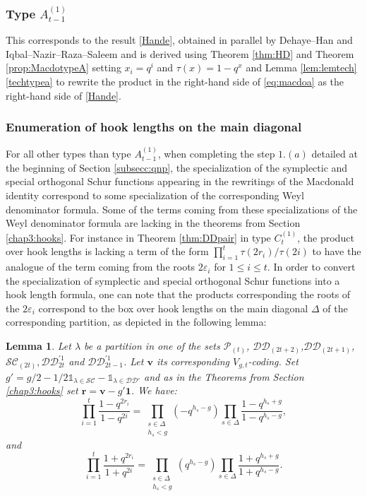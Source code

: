 \documentclass[11pt,letterpaper]{amsart}
\def\ccsc{\mathcal {SC}}
\def\ccdd{\mathcal {DD}}
\def\ccp{\mathcal P}
\newtheorem{lm}[df]{Lemma}
\numberwithin{equation}{section}
\numberwithin{df}{section}
\begin{document}
\subsubsection{Type $A^{(1)}_{t-1}$}

This corresponds to the result \eqref{Hande}, obtained in parallel by Dehaye--Han \cite{HD} and Iqbal--Nazir--Raza--Saleem \cite{INRS} and is derived using Theorem \ref{thm:HD} and Theorem \ref{prop:MacdotypeA} setting $x_i=q^i$ and $\tau(x)=1-q^x$ and Lemma \ref{lem:lemtech} \eqref{techtypea} to rewrite the product in the right-hand side of \eqref{eq:macdoa} as the right-hand side of \eqref{Hande}.

\subsubsection{Enumeration of hook lengths on the main diagonal}

For all other types than type $A^{(1)}_{t-1}$, when completing the step $1.(a)$ detailed at the beginning of Section \ref{subsecc:qnp}, the specialization of the symplectic and special orthogonal Schur functions appearing in the rewritings of the Macdonald identity correspond to some specialization of the corresponding Weyl denominator formula. Some of the terms coming from these specializations of the Weyl denominator formula are lacking in the theorems from Section \ref{chap3:hooks}. For instance in Theorem \ref{thm:DDpair} in type $C_{t}^{(1)}$, the product over hook lengths is lacking a term of the form $\prod_{i=1}^t\tau(2r_i)/\tau(2i)$ to have the analogue of the term coming from the roots $2\varepsilon_i$ for $1\leq i \leq t$. In order to convert the specialization of symplectic and special orthogonal Schur functions into a hook length formula, one can note that the products corresponding the roots of the $2\varepsilon_i$ correspond to the box over hook lengths on the main diagonal $\Delta$ of the corresponding partition, as depicted in the following lemma:

\begin{lm}\label{lm:lemdiag}
Let $\lambda$ be a partition in one of the sets $\ccp_{(t)}$, $\ccdd_{(2t+2)}$,$\ccdd_{(2t+1)}$, $\ccsc_{(2t)},\ccdd_{2t}^{'1}$ and $\ccdd_{2t-1}^{'1}$. Let $\mathbf{v}$ its corresponding $V_{g,t}$-coding. Set $g'=g/2-1/2\mathds{1}_{\lambda\in \ccsc}-\mathds{1}_{\lambda\in \ccdd'}$ and as in the Theorems from Section \ref{chap3:hooks} set $\mathbf{r}=\mathbf{v}-g'\mathbf{1}$. We have:
$$\prod_{i=1}^t\frac{1-q^{2r_i}}{1-q^{2i}}=\prod_{\substack{s\in \Delta\\h_s<g}}(-q^{h_s-g})\prod_{s\in\Delta}
\frac{1-q^{h_s+g}}{1-q^{h_s-g}},$$
and
$$\prod_{i=1}^t\frac{1+q^{2r_i}}{1+q^{2i}}=\prod_{\substack{s\in \Delta\\h_s<g}}(q^{h_s-g})\prod_{s\in\Delta}
\frac{1+q^{h_s+g}}{1+q^{h_s-g}}.$$
\end{lm}
\end{document}
